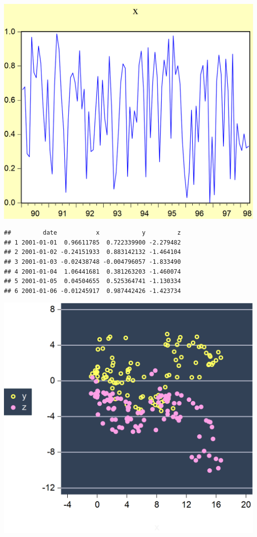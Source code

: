 \documentclass[
]{article}
\begin{document}
\begin{center}\includegraphics[width=\textwidth]{test_engEviews_files/figure-latex//eview-graph-x} \end{center}

\begin{verbatim}
##         date           x            y         z
## 1 2001-01-01  0.96611785  0.722339900 -2.279482
## 2 2001-01-02 -0.24151933  0.883142132 -1.464104
## 3 2001-01-03 -0.02438748 -0.004796057 -1.833490
## 4 2001-01-04  1.06441681  0.381263203 -1.460074
## 5 2001-01-05  0.04504655  0.525364741 -1.130334
## 6 2001-01-06 -0.01245917  0.987442426 -1.423734
\end{verbatim}

\begin{center}\includegraphics[width=\textwidth]{test_engEviews_files/figure-latex//rwalk-xyz} \end{center}
\end{document}
